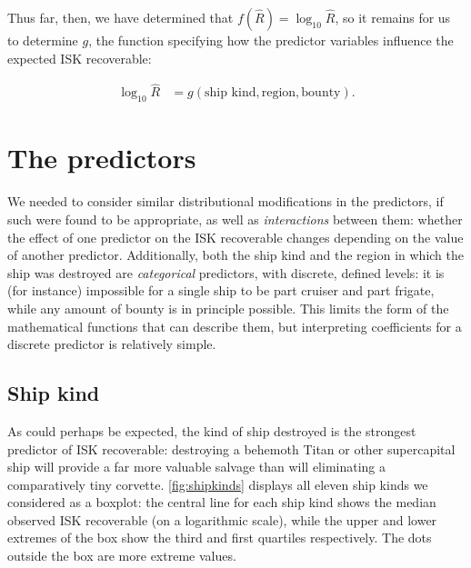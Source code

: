 \documentclass[letterpaper,12pt,article]{memoir}
\begin{document}
Thus far, then, we have determined that $f(\widehat{R}) = \log_{10}{\widehat{R}}$, 
so it remains for us to determine $g$, the function specifying how the predictor
variables influence the expected ISK recoverable:

\begin{align} \label{eq:loggedResp}
    \log_{10}{\widehat{R}} &= g(\textrm{ship kind},\textrm{region},\textrm{bounty}).
\end{align}

\section{The predictors}

We needed to consider similar distributional modifications in the predictors, if
such were found to be appropriate, as well as \textit{interactions} between them:
whether the effect of one predictor on the ISK recoverable changes depending on 
the value of another predictor. Additionally, both the ship kind and the region
in which the ship was destroyed are \textit{categorical} predictors, with discrete,
defined levels: it is (for instance) impossible for a single ship to be part 
cruiser and part frigate, while any amount of bounty is in principle possible. This
limits the form of the mathematical functions that can describe them, but 
interpreting coefficients for a discrete predictor is relatively simple.

\subsection{Ship kind}

As could perhaps be expected, the kind of ship destroyed is the strongest 
predictor of ISK recoverable: destroying a behemoth Titan or other supercapital
ship will provide a far more valuable salvage than will eliminating a 
comparatively tiny corvette. \cref{fig:shipkinds} displays all eleven ship kinds
we considered as a boxplot: the central line for each ship kind shows the median
observed ISK recoverable (on a logarithmic scale), while the upper and lower 
extremes of the box show the third and first quartiles respectively. The dots
outside the box are more extreme values.
\end{document}
